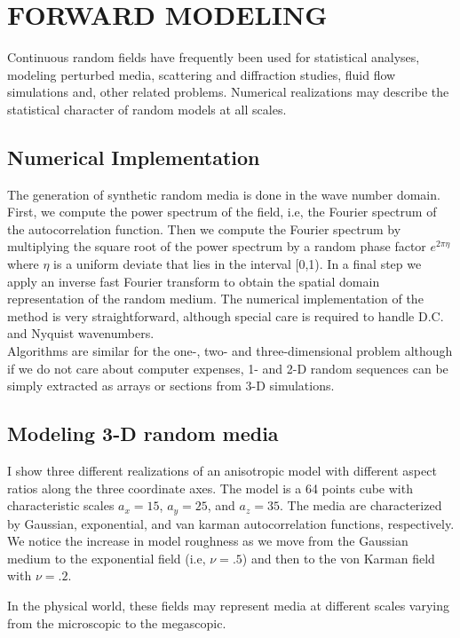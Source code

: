 \section{ FORWARD MODELING }

Continuous random
fields have frequently been used for statistical analyses, modeling perturbed
media, scattering and diffraction studies, fluid flow simulations and,
other related problems. Numerical realizations may describe the 
statistical character of 
random models at all scales. 

\subsection{ Numerical Implementation }

The generation of synthetic random media is done in the wave number domain. 
First, we compute the power spectrum of the field, i.e, the Fourier spectrum of
the autocorrelation function. Then we compute the Fourier spectrum by
multiplying the square root of the power spectrum by a random phase factor 
$e^{2\pi\eta}$ where $\eta$ is a uniform deviate that lies 
in the interval [0,1).
In a final step we apply an inverse fast Fourier transform to 
obtain the spatial domain representation of the random medium.
The numerical implementation of the method is very straightforward, although
special care is required to handle D.C. and Nyquist wavenumbers.\\
Algorithms are similar for the one-, two- and three-dimensional problem
although if we do not care about computer expenses, 1- and 2-D random
sequences can be simply extracted as arrays or sections from 3-D
simulations. 


\subsection{ Modeling 3-D random media}

I show three different realizations of an anisotropic model with different
aspect ratios along the three coordinate axes. The model is a 64 points cube 
with characteristic scales $a_x=15$, $a_y=25$, and $a_z=35$. The media are characterized 
by Gaussian, exponential, and van karman autocorrelation functions, respectively.
We notice the increase in model roughness as we move from the Gaussian medium
to the exponential field (i.e, $\nu=.5$) and then to the von Karman field with
$\nu=.2$.\
\par
In the physical world, these fields may represent media at different scales
varying from the microscopic to the megascopic. 

